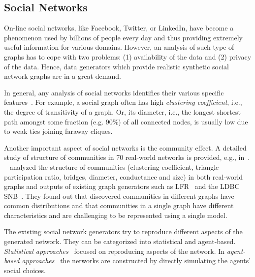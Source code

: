 \subsection{Social Networks}
\label{sec:generators_socialnetworks}

On-line social networks, like Facebook, Twitter, or LinkedIn, have become a
phenomenon used by billions of people every day and thus providing extremely
useful information for various domains. However, an analysis of such type of
graphs has to cope with two problems: (1) availability of the data and (2)
privacy of the data. Hence, data generators which provide realistic synthetic
social network graphs are in a great demand.

In general, any analysis of social networks identifies their various specific
features~\cite{Chakrabarti:2006:GML:1132952.1132954}. For example, a social
graph often has high \emph{clustering coefficient}, i.e., the degree of
transitivity of a graph. Or, its diameter, i.e., the longest shortest path
amongst some fraction (e.g. 90\%) of all connected nodes, is usually low due to
weak ties joining faraway cliques.

Another important aspect of social networks is the community effect. A detailed
study of structure of communities in 70 real-world networks is provided, e.g.,
in~\cite{Leskovec:2008:SPC:1367497.1367591}.
~\cite{Prat-Perez:2014:CSS:2621934.2621942} analyzed the structure of
communities (clustering coefficient, triangle participation ratio, bridges,
diameter, conductance and size) in both real-world graphs and outputs of
existing graph generators such as LFR~\cite{PhysRevE.78.046110} and the
LDBC SNB~\cite{Erling:2015:LSN:2723372.2742786}. They found out that discovered
communities  in different graphs have common distributions and that communities
in a single graph have different characteristics and are challenging to be represented using a single
model.

The existing social network generators try to reproduce different aspects of the
generated network. They can be categorized into statistical and agent-based.
\emph{Statistical
approaches}~\cite{PhysRevE.78.046110,Yao2011,Armstrong:2013:LDB:2463676.2465296,Pham2013,Sukthankar-SocialInfo2014,Erling:2015:LSN:2723372.2742786,Nettleton2016}
focused on reproducing aspects of the network. In \emph{agent-based
approaches}~\cite{Barrett:2009:GAL:1995456.1995598,Bernstein:2013:SAS:2499604.2499609}
the networks are constructed by directly simulating the agents' social choices.


